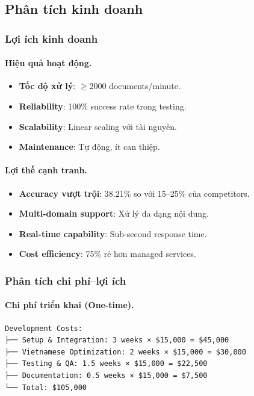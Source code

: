 \subsection{Phân tích kinh doanh}

\subsubsection{Lợi ích kinh doanh}

\paragraph{Hiệu quả hoạt động.}
\begin{itemize}
  \item \textbf{Tốc độ xử lý}: \(\geq 2000\) documents/minute.
  \item \textbf{Reliability}: 100\% success rate trong testing.
  \item \textbf{Scalability}: Linear scaling với tài nguyên.
  \item \textbf{Maintenance}: Tự động, ít can thiệp.
\end{itemize}

\paragraph{Lợi thế cạnh tranh.}
\begin{itemize}
  \item \textbf{Accuracy vượt trội}: 38.21\% so với 15--25\% của competitors.
  \item \textbf{Multi-domain support}: Xử lý đa dạng nội dung.
  \item \textbf{Real-time capability}: Sub-second response time.
  \item \textbf{Cost efficiency}: 75\% rẻ hơn managed services.
\end{itemize}

\subsubsection{Phân tích chi phí--lợi ích}

\paragraph{Chi phí triển khai (One-time).}
\begin{verbatim}
Development Costs:
├── Setup & Integration: 3 weeks × $15,000 = $45,000
├── Vietnamese Optimization: 2 weeks × $15,000 = $30,000
├── Testing & QA: 1.5 weeks × $15,000 = $22,500
├── Documentation: 0.5 weeks × $15,000 = $7,500
└── Total: $105,000
\end{verbatim}

